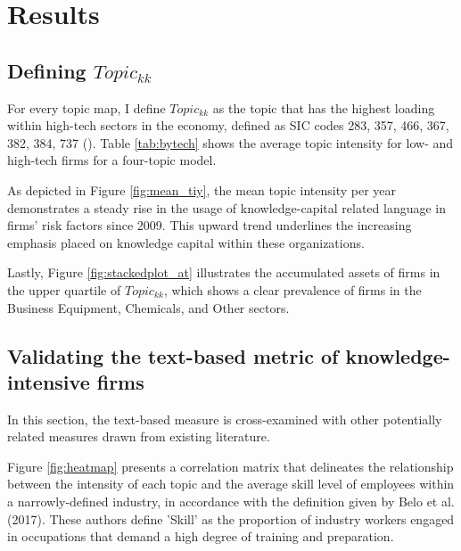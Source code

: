 \documentclass[12pt, letterpaper]{article}
\begin{document}


\section{Results}

\subsection{Defining $Topic_{kk}$}

For every topic map, I define $Topic_{kk}$ as the topic that has the highest loading within high-tech sectors in the economy, defined as SIC codes 283, 357, 466, 367, 382, 384, 737 (\cite{Brown2009-zp}). Table \ref{tab:bytech} shows the average topic intensity for low- and high-tech firms for a four-topic model. 



As depicted in Figure \ref{fig:mean_tiy}, the mean topic intensity per year demonstrates a steady rise in the usage of knowledge-capital related language in firms' risk factors since 2009. This upward trend underlines the increasing emphasis placed on knowledge capital within these organizations.

Lastly, Figure \ref{fig:stackedplot_at} illustrates the accumulated assets of firms in the upper quartile of $Topic_{kk}$, which shows a clear prevalence of firms in the Business Equipment, Chemicals, and Other sectors.


\subsection{Validating the text-based metric of knowledge-intensive firms}
  
In this section, the text-based measure \tkk  is cross-examined with other potentially related measures drawn from existing literature.

Figure \ref{fig:heatmap} presents a correlation matrix that delineates the relationship between the intensity of each topic and the average skill level of employees within a narrowly-defined industry, in accordance with the definition given by Belo et al. (2017). These authors define 'Skill' as the proportion of industry workers engaged in occupations that demand a high degree of training and preparation.
\end{document}
